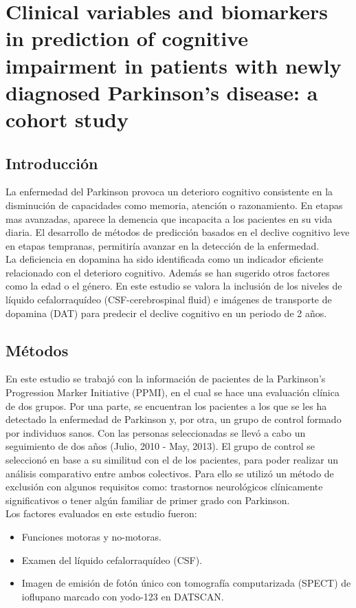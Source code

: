 \documentclass[12pt]{article}
\begin{document}
\section{Clinical variables and biomarkers in prediction of cognitive impairment in patients with newly diagnosed Parkinson’s disease: a cohort study}


\subsection{Introducción}

La enfermedad del Parkinson provoca un deterioro cognitivo consistente en la disminución de capacidades como memoria, atención o razonamiento. En etapas mas avanzadas, aparece la demencia que incapacita a los pacientes en su vida diaria. El desarrollo de métodos de predicción basados en el declive cognitivo leve en etapas tempranas, permitiría avanzar en la detección de la enfermedad. \\


La deficiencia en dopamina ha sido identificada como un indicador eficiente relacionado con el deterioro cognitivo. Además se han sugerido otros factores como la edad o el género. En este estudio se valora la inclusión de los niveles de líquido cefalorraquídeo (CSF-cerebrospinal fluid) e imágenes de transporte de dopamina (DAT) para predecir el declive cognitivo en un periodo de 2 años.

\subsection{Métodos}
En este estudio se trabajó con la información de pacientes de la Parkinson’s Progression Marker Initiative (PPMI), en el cual se hace una evaluación clínica de dos grupos. Por una parte, se encuentran los pacientes a los que se les ha detectado la enfermedad de Parkinson y, por otra, un grupo de control formado por individuos sanos. Con las personas seleccionadas se llevó a cabo un seguimiento de dos años (Julio, 2010 - May, 2013). El grupo de control se seleccionó en base a su similitud con el de los pacientes, para poder realizar un análisis comparativo entre ambos colectivos. Para ello se utilizó un método de exclusión con algunos requisitos como: trastornos neurológicos clínicamente significativos o tener algún familiar de primer grado con Parkinson.\\

Los factores evaluados en este estudio fueron: 
\begin{itemize}
	\item Funciones motoras y no-motoras.
	\item Examen del líquido cefalorraquídeo (CSF).
	\item Imagen de emisión de fotón único con tomografía computarizada (SPECT) de ioflupano marcado con yodo-123 en DATSCAN.
\end{itemize}
\end{document}
